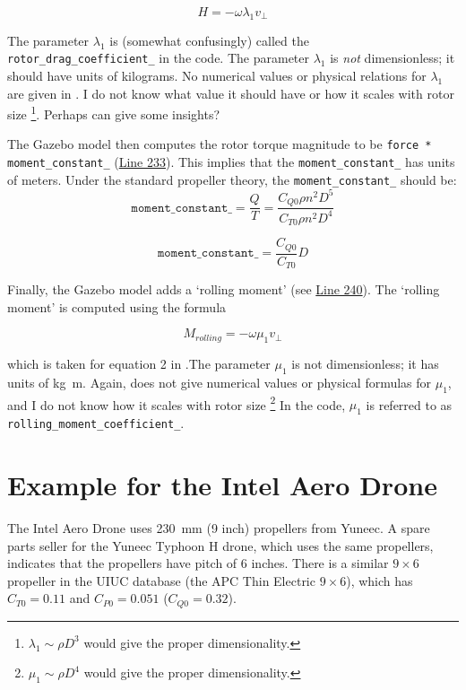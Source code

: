 \documentclass[12pt]{article}
\begin{document}
\begin{equation}
H = - \omega \lambda_1 v_{\perp}
\end{equation}

The parameter $\lambda_1$ is (somewhat confusingly) called the \texttt{rotor\_drag\_coefficient\_} in the code.
The parameter $\lambda_1$ is \emph{not} dimensionless; it should have units of kilograms. No numerical values or physical relations for $\lambda_1$ are given in \cite{martin:hal-00422423}.
I do not know what value it should have or how it scales with rotor size \footnote{$\lambda_1 \sim \rho D^3$ would give the proper dimensionality.}. Perhaps \cite{2016arXiv160100733B} can give some insights?

The Gazebo model then computes the rotor torque magnitude to be \texttt{force * moment\_constant\_} (\href{https://github.com/PX4/sitl_gazebo/blob/d08eb5b22d3edfb7a740c883b06f895a173b5519/src/gazebo_motor_model.cpp#L233}{Line 233}). This implies that the \texttt{moment\_constant\_} has units of meters. Under the standard propeller theory, the \texttt{moment\_constant\_} should be:
\[
\mathtt{moment\_constant\_} = \frac{Q}{T} = \frac{C_{Q0} \rho n^2 D^5}{C_{T0} \rho n^2 D^4}
\]

\begin{equation}
\mathtt{moment\_constant\_} = \frac{C_{Q0}}{C_{T0}} D
\end{equation}

Finally, the Gazebo model adds a `rolling moment' (see \href{https://github.com/PX4/sitl_gazebo/blob/d08eb5b22d3edfb7a740c883b06f895a173b5519/src/gazebo_motor_model.cpp#L240}{Line 240}). The `rolling moment' is computed using the formula

\begin{equation}
M_{rolling} = - \omega \mu_1 v_\perp
\end{equation}

which is taken for equation 2 in \cite{martin:hal-00422423}.The parameter $\mu_1$ is not dimensionless; it has units of \si{\kilogram \meter}. Again, \cite{martin:hal-00422423} does not give numerical values or physical formulas for $\mu_1$, and I do not know how it scales with rotor size \footnote{$\mu_1 \sim \rho D^4$ would give the proper dimensionality.}
In the code, $\mu_1$ is referred to as \texttt{rolling\_moment\_coefficient\_}.


\section{Example for the Intel Aero Drone}
The Intel Aero Drone uses \SI{230}{\milli\meter} (9 inch) propellers from Yuneec. A spare parts seller for the Yuneec Typhoon H drone, which uses the same propellers, indicates that the propellers have pitch of 6 inches. There is a similar $9 \times 6$ propeller in the UIUC database (the APC Thin Electric $9 \times 6$), which has $C_{T0} = 0.11$ and $C_{P0} = 0.051$ ($C_{Q0} = 0.32$).
\end{document}
